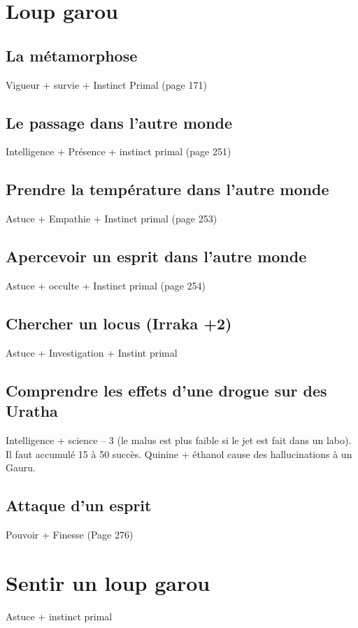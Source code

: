 \documentclass[oneside,12pt]{book}
\begin{document}
\begin{flushleft}
\section{Loup garou}
\subsection{La métamorphose}
Vigueur + survie + Instinct Primal (page 171)
\subsection{Le passage dans l'autre monde}
Intelligence + Présence + instinct primal (page 251) 
\subsection{Prendre la température dans l'autre monde}
Astuce + Empathie + Instinct primal (page 253) 
\subsection{Apercevoir un esprit dans l'autre monde}
Astuce + occulte + Instinct primal (page 254) 
\subsection{Chercher un locus (Irraka +2)}
Astuce + Investigation + Instint primal

\subsection{Comprendre les effets d'une drogue sur des Uratha}
Intelligence + science – 3 (le malus est plus faible si le jet est fait dans un labo). Il faut accumulé 15 à 50 succès.
Quinine + éthanol cause des hallucinations à un Gauru.

\subsection{Attaque d'un esprit}
Pouvoir + Finesse (Page 276)

\section{Sentir un loup garou}
Astuce + instinct primal





\end{flushleft}
\end{document}
